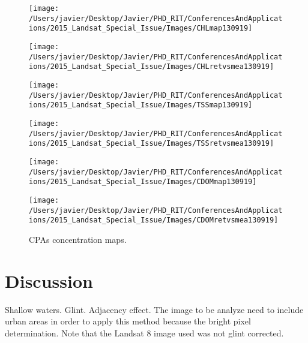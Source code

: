 \documentclass[onecolumn,3p]{elsarticle}
\begin{document}
\begin{figure}[!ht]
  \begin{minipage}[c]{0.40\linewidth}
      \texttt{[image: /Users/javier/Desktop/Javier/PHD\_RIT/ConferencesAndApplications/2015\_Landsat\_Special\_Issue/Images/CHLmap130919]}  
  \end{minipage}
  \hfill
  \begin{minipage}[d]{0.45\linewidth}
      \texttt{[image: /Users/javier/Desktop/Javier/PHD\_RIT/ConferencesAndApplications/2015\_Landsat\_Special\_Issue/Images/CHLretvsmea130919]}
  \end{minipage}

  \begin{minipage}[c]{0.40\linewidth}
      \texttt{[image: /Users/javier/Desktop/Javier/PHD\_RIT/ConferencesAndApplications/2015\_Landsat\_Special\_Issue/Images/TSSmap130919]}  
  \end{minipage}
  \hfill
  \begin{minipage}[d]{0.45\linewidth}
      \texttt{[image: /Users/javier/Desktop/Javier/PHD\_RIT/ConferencesAndApplications/2015\_Landsat\_Special\_Issue/Images/TSSretvsmea130919]}

  \end{minipage}

  \begin{minipage}[c]{0.40\linewidth}
      \texttt{[image: /Users/javier/Desktop/Javier/PHD\_RIT/ConferencesAndApplications/2015\_Landsat\_Special\_Issue/Images/CDOMmap130919]}  
  \end{minipage}
  \hfill
  \begin{minipage}[d]{0.45\linewidth}
      \texttt{[image: /Users/javier/Desktop/Javier/PHD\_RIT/ConferencesAndApplications/2015\_Landsat\_Special\_Issue/Images/CDOMretvsmea130919]}
  \end{minipage}

  \caption{CPAs concentration maps. \label{fig:CPAsMaps} } 
\end{figure}
\section{Discussion}
Shallow waters.
Glint.
Adjacency effect.
The image to be analyze need to include urban areas in order to apply this method because the bright pixel determination. Note that the Landsat 8 image used was not glint corrected.
\end{document}
